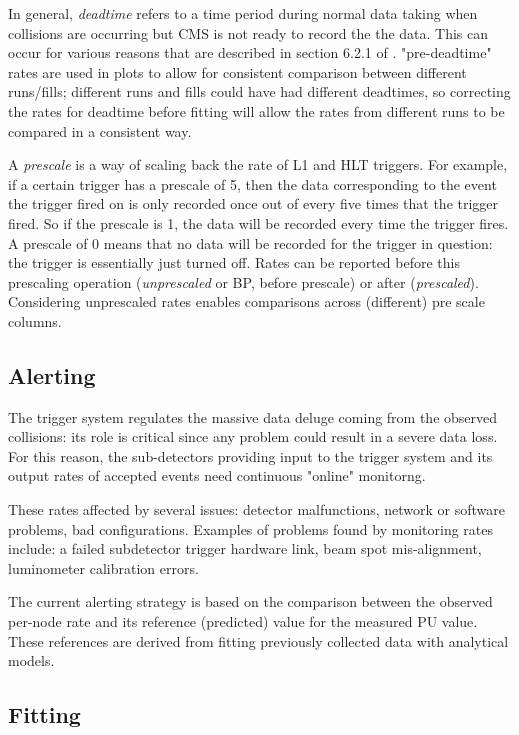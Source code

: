 In general, \textit{deadtime} refers to a time period during normal data taking when collisions are occurring but CMS is not ready to record the the data. This can occur for various reasons that are described in section 6.2.1 of \cite{Khachatryan_2017}. "pre-deadtime" rates are used in plots to allow for consistent comparison between different runs/fills; different runs and fills could have had different deadtimes, so correcting the rates for deadtime before fitting will allow the rates from different runs to be compared in a consistent way.

A \textit{prescale} is a way of scaling back the rate of L1 and HLT triggers. For example, if a certain trigger has a prescale of 5, then the data corresponding to the event the trigger fired on is only recorded once out of every five times that the trigger fired. So if the prescale is 1, the data will be recorded every time the trigger fires. A prescale of 0 means that no data will be recorded for the trigger in question: the trigger is essentially just turned off. Rates can be reported before this prescaling operation (\textit{unprescaled} or BP, before prescale) or after (\textit{prescaled}). Considering unprescaled rates enables comparisons across (different) pre scale columns.

\subsection{Alerting}

The trigger system regulates the massive data deluge coming from the observed collisions: its role is critical since any problem could result in a severe data loss. For this reason, the sub-detectors providing input to the trigger system and its output rates of accepted events need continuous "online" monitorng.

These rates affected by several issues: detector malfunctions, network or software problems, bad configurations. Examples of problems found by monitoring rates include: a failed  subdetector trigger hardware link, beam spot mis-alignment, luminometer calibration errors.

The current alerting strategy is based on the comparison between the observed per-node rate and its reference (predicted) value for the measured PU value. These references are derived from fitting previously collected data with analytical models.

\subsection{Fitting}

